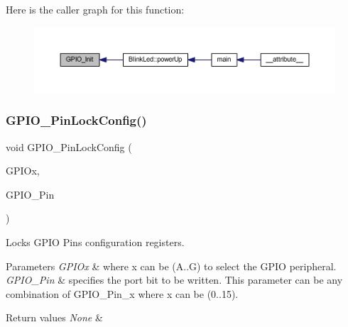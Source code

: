 Here is the caller graph for this function\+:
\nopagebreak
\begin{figure}[H]
\begin{center}
\leavevmode
\includegraphics[width=350pt]{group___g_p_i_o___private___functions_ga71abf9404261370d03cca449b88d3a65_icgraph}
\end{center}
\end{figure}
\mbox{\label{group___g_p_i_o___private___functions_gad2f2e615928c69fd0d8c641a7cedaafc}} 
\subsubsection{\texorpdfstring{G\+P\+I\+O\+\_\+\+Pin\+Lock\+Config()}{GPIO\_PinLockConfig()}}
{\footnotesize\ttfamily void G\+P\+I\+O\+\_\+\+Pin\+Lock\+Config (\begin{DoxyParamCaption}\item[{\hyperlink{struct_g_p_i_o___type_def}{G\+P\+I\+O\+\_\+\+Type\+Def} $\ast$}]{G\+P\+I\+Ox,  }\item[{uint16\+\_\+t}]{G\+P\+I\+O\+\_\+\+Pin }\end{DoxyParamCaption})}



Locks G\+P\+IO Pins configuration registers. 


\begin{DoxyParams}{Parameters}
{\em G\+P\+I\+Ox} & where x can be (A..G) to select the G\+P\+IO peripheral. \\
\hline
{\em G\+P\+I\+O\+\_\+\+Pin} & specifies the port bit to be written. This parameter can be any combination of G\+P\+I\+O\+\_\+\+Pin\+\_\+x where x can be (0..15). \\
\hline
\end{DoxyParams}

\begin{DoxyRetVals}{Return values}
{\em None} & \\
\hline
\end{DoxyRetVals}


